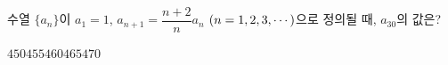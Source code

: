 \hspace*{2mm}\begin{minipage}[t]{\dimexpr\linewidth-2mm\relax}\vspace{0pt}
수열 $\{a_n\}$이 $a_1=1$, $a_{n+1}=\dfrac{n+2}{n}a_n$ $(n=1{,}\mkern3mu\mathopen{}2{,}\mkern3mu\mathopen{}3{,}\mkern3mu\mathopen{}\cdots)$으로 정의될 때, $a_{30}$의 값은?
\begin{choices32}{$450$}{$455$}{$460$}{$465$}{$470$}\end{choices32}\end{minipage}
